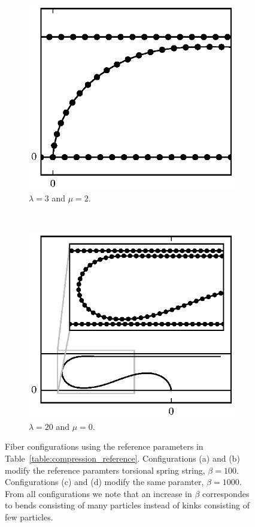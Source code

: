{\begin{figure}
		\begin{subfigure}{.5\textwidth}
			\centering
			\includegraphics{./fig/ch3/push/b1000/l3_m2.eps}
			\caption{$\lambda=3$ and $\mu=2$.\label{subfig:curved}}
		\end{subfigure}%
		~	
		\begin{subfigure}{.5\textwidth}
			\centering
			\includegraphics{./fig/ch3/push/b1000/l20_m0.eps}
			\caption{$\lambda=20$ and $\mu=0$.\label{subfig:long_loop}}
		\end{subfigure}	
		\caption{Fiber configurations using the reference parameters in Table~\ref{table:compression_reference}. Configurations (a) and (b) modify the reference paramters torsional spring string, $\beta=100$. Configurations (c) and (d) modify the same paramter, $\beta=1000$. From all configurations we note that an increase in $\beta$ correspondes to bends consisting of many particles instead of kinks consisting of few particles.\label{fig:bending_fiber}}	
	\end{figure}

}
